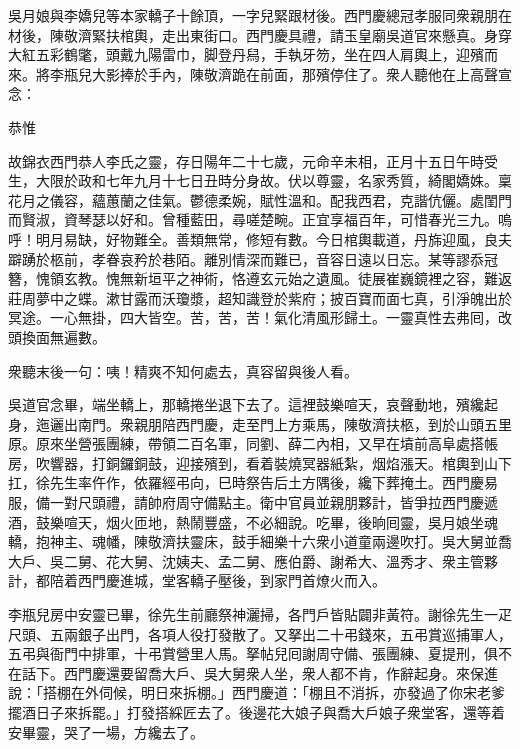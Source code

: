 吳月娘與李嬌兒等本家轎子十餘頂，一字兒緊跟材後。西門慶總冠孝服同衆親朋在材後，陳敬濟緊扶棺輿，走出東街口。西門慶具禮，請玉皇廟吳道官來懸真。身穿大紅五彩鶴氅，頭戴九陽雷巾，脚登丹舄，手執牙笏，坐在四人肩輿上，迎殯而來。將李瓶兒大影捧於手內，陳敬濟跪在前面，那殯停住了。衆人聽他在上高聲宣念：

\begin{myquote}[\markfont]
恭惟

故錦衣西門恭人李氏之靈，存日陽年二十七歲，元命辛未相，正月十五日午時受生，大限於政和七年九月十七日丑時分身故。伏以尊靈，名家秀質，綺閣嬌姝。稟花月之儀容，蘊蕙蘭之佳氣。鬱德柔婉，賦性溫和。配我西君，克諧伉儷。處閨門而賢淑，資琴瑟以好和。曾種藍田，尋嗟楚畹。正宜享福百年，可惜春光三九。{}嗚呼！明月易缺，好物難全。善類無常，修短有數。今日棺輿載道，丹旆迎風，良夫躃踴於柩前，孝眷哀矜於巷陌。離別情深而難已，音容日遠以日忘。某等謬忝冠簪，愧領玄教。愧無新垣平之神術，{}恪遵玄元始之遺風。徒展崔巍鏡裡之容，難返莊周夢中之蝶。漱甘露而沃瓊漿，超知識登於紫府；披百寶而面七真，引淨魄出於冥途。一心無掛，四大皆空。苦，苦，苦！氣化清風形歸土。一靈真性去弗囘，改頭換面無遍數。

衆聽末後一句：咦！精爽不知何處去，真容留與後人看。
\end{myquote}

吳道官念畢，端坐轎上，那轎捲坐退下去了。這裡鼓樂喧天，哀聲動地，殯纔起身，迤邐出南門。衆親朋陪西門慶，走至門上方乘馬，陳敬濟扶柩，到於山頭五里原。原來坐營張團練，帶領二百名軍，同劉、薛二內相，又早在墳前高阜處搭帳房，吹響器，打銅鑼銅鼓，迎接殯到，{}看着裝燒冥器紙紮，烟焰漲天。棺輿到山下扛，徐先生率仵作，依羅經弔向，巳時祭告后土方隅後，纔下葬掩土。西門慶易服，備一對尺頭禮，請帥府周守備點主。衛中官員並親朋夥計，皆爭拉西門慶遞酒，鼓樂喧天，烟火匝地，熱鬧豐盛，不必細說。吃畢，後晌囘靈，吳月娘坐魂轎，抱神主、魂幡，陳敬濟扶靈床，鼓手細樂十六衆小道童兩邊吹打。吳大舅並喬大戶、吳二舅、花大舅、沈姨夫、孟二舅、應伯爵、謝希大、溫秀才、衆主管夥計，都陪着西門慶進城，堂客轎子壓後，到家門首燎火而入。

李瓶兒房中安靈已畢，徐先生前廳祭神灑掃，各門戶皆貼闢非黃符。謝徐先生一疋尺頭、五兩銀子出門，各項人役打發散了。又拏出二十弔錢來，五弔賞巡捕軍人，五弔與衙門中排軍，十弔賞營里人馬。拏帖兒囘謝周守備、張團練、夏提刑，俱不在話下。西門慶還要留喬大戶、吳大舅衆人坐，衆人都不肯，作辭起身。來保進說：「搭棚在外伺候，明日來拆棚。」西門慶道：「棚且不消拆，亦發過了你宋老爹擺酒日子來拆罷。」打發搭綵匠去了。後邊花大娘子與喬大戶娘子衆堂客，還等着安畢靈，哭了一場，方纔去了。

